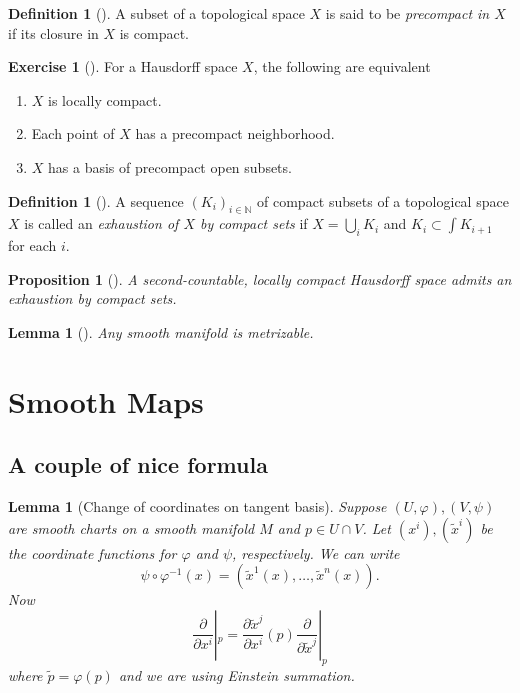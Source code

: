 \documentclass[reqno]{amsart}
\newtheorem{lemma}[theorem]{Lemma}
\newtheorem{proposition}[theorem]{Proposition}
\theoremstyle{definition}
\newtheorem{definition}[theorem]{Definition}
\newtheorem{exercise}[theorem]{Exercise}
\theoremstyle{remark}
\begin{document}
\begin{definition}[]
    A subset of a topological space $X$ is said to
    be \textit{precompact in $X$} if its closure in
    $X$ is compact.
\end{definition}

\begin{exercise}[]
    For a Hausdorff space $X$, the following are equivalent
    \begin{enumerate}
        \item $X$ is locally compact.
        \item Each point of $X$ has a precompact neighborhood.
        \item $X$ has a basis of precompact open subsets.
    \end{enumerate}
\end{exercise}


\begin{definition}[]
    A sequence 
    $\left( K_i \right)_{i \in \mathbb{N} }$ of compact subsets
    of a topological space $X$ is called an
    \textit{exhaustion of $X$ by compact sets} if
    $X = \bigcup_{i}  K_i$ and
    $K_i \subset \int K_{i+1}$ for each $i$.
\end{definition}

\begin{proposition}[]
    A second-countable, locally compact
    Hausdorff space admits an exhaustion by compact
    sets.
\end{proposition}


\begin{lemma}[]\label{Smooth-Mfds-Metrizable}
    \cite[Lemma 5.9]{GG}
    Any smooth manifold is metrizable.
\end{lemma}


\section{Smooth Maps}


\subsection{A couple of nice formula}

\begin{lemma}[Change of coordinates on tangent basis]
    Suppose
    $\left( U, \varphi  \right) ,
    \left( V,\psi  \right) $ are smooth charts
    on a smooth manifold $M$ and $p \in U \cap V$.
    Let $\left( x^{i} \right) , \left( \tilde{x}^{i} \right) $ 
    be the coordinate functions for $\varphi $ and $\psi $,
    respectively. 
    We can write
    \[
    \psi \circ \varphi^{-1} (x) =
    \left( \tilde{x}^{1}(x),\ldots,
    \tilde{x}^{n}(x) \right) .
    \] 
    Now
    \[
    \frac{\partial}{\partial x^{i}}|_{p}
    = \frac{\partial \tilde{x}^{j}}{\partial x^{i}}(p)
    \frac{\partial}{\partial \tilde{x}^{j}}|_p
    \] 
    where $\tilde{p} = \varphi (p)$ and we are using
    Einstein summation.
\end{lemma}
\end{document}
